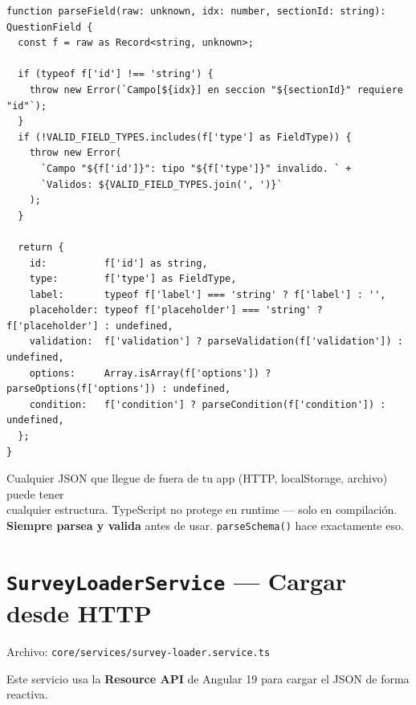 \documentclass[12pt, a4paper]{article}
\begin{document}
\begin{lstlisting}
function parseField(raw: unknown, idx: number, sectionId: string): QuestionField {
  const f = raw as Record<string, unknown>;

  if (typeof f['id'] !== 'string') {
    throw new Error(`Campo[${idx}] en seccion "${sectionId}" requiere "id"`);
  }
  if (!VALID_FIELD_TYPES.includes(f['type'] as FieldType)) {
    throw new Error(
      `Campo "${f['id']}": tipo "${f['type']}" invalido. ` +
      `Validos: ${VALID_FIELD_TYPES.join(', ')}`
    );
  }

  return {
    id:          f['id'] as string,
    type:        f['type'] as FieldType,
    label:       typeof f['label'] === 'string' ? f['label'] : '',
    placeholder: typeof f['placeholder'] === 'string' ? f['placeholder'] : undefined,
    validation:  f['validation'] ? parseValidation(f['validation']) : undefined,
    options:     Array.isArray(f['options']) ? parseOptions(f['options']) : undefined,
    condition:   f['condition'] ? parseCondition(f['condition']) : undefined,
  };
}
\end{lstlisting}

\begin{tcolorbox}[peligro, title={\emoji{warning} \emoji{skull} Nunca Confíes en JSON Externo}]
  Cualquier JSON que llegue de fuera de tu app (HTTP, localStorage, archivo) puede tener\\
  cualquier estructura. TypeScript no protege en runtime --- solo en compilación.\\[0.3cm]
  \textbf{Siempre parsea y valida} antes de usar. \texttt{parseSchema()} hace exactamente eso.
\end{tcolorbox}

\section{  \texttt{SurveyLoaderService} --- Cargar desde HTTP}

Archivo: \textcolor{morado}{\texttt{core/services/survey-loader.service.ts}}

Este servicio usa la \textbf{Resource API} de Angular 19 para cargar el JSON de forma reactiva.
\end{document}
